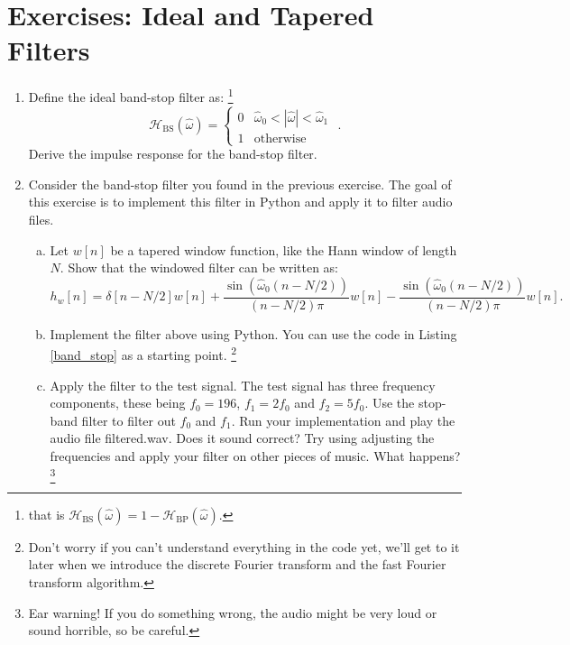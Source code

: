 \newpage
\section{Exercises: Ideal and Tapered Filters}

\begin{enumerate}
\item Define the ideal band-stop filter as: \footnote{that is $\mathcal{H}_{\mathrm{BS}}(\hat{\omega})=1 - \mathcal{H}_{\mathrm{BP}}(\hat{\omega})$.}
\begin{equation}
\mathcal{H}_{\mathrm{BS}}(\hat{\omega}) = \left\{ \begin{array}{cc}
0 & \hat{\omega}_0 < |\hat{\omega}| < \hat{\omega}_1 \\
1 & \mathrm{otherwise}
\end{array}\right.\,\,.
\end{equation}
Derive the impulse response for the band-stop filter.

\item Consider the band-stop filter you found in the previous exercise. The goal of this exercise is to implement this filter in Python and apply it to filter audio files.

\begin{enumerate}[a)]
\item Let $w[n]$ be a tapered window function, like the Hann window of length $N$. Show that the windowed filter can be written as:
$$h_{w}[n]=\delta[n-N/2]w[n] +  \frac{\sin(\hat{\omega}_{0}(n-N/2))}{(n-N/2)\pi}w[n] - \frac{\sin(\hat{\omega}_{0}(n-N/2))}{(n-N/2)\pi}w[n].$$

\item Implement the filter above using Python. You can use the code in Listing \ref{band_stop} as a starting point. 
\footnote{Don't worry if you can't understand everything in the code yet, we'll get to it later when we introduce the discrete Fourier transform and the fast Fourier transform algorithm.}


\item Apply the filter to the test signal. The test signal has three frequency components, these being $f_{0}=196$, $f_{1}=2f_{0}$ and $f_{2}=5f_{0}$. 
Use the stop-band filter to filter out $f_{0}$ and $f_{1}$. Run your implementation and play the audio file filtered.wav. 
Does it sound correct? Try using adjusting the frequencies and apply your filter on other pieces of music. What happens? 
\footnote{Ear warning! If you do something wrong, the audio might be very loud or sound horrible, so be careful.}

\end{enumerate}






\end{enumerate}